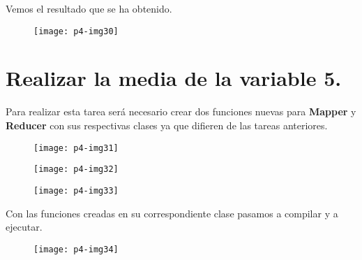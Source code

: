 \documentclass[10pt]{article}
\begin{document}
Vemos el resultado que se ha obtenido. \\

\begin{figure}[H]
	\begin{center}
 		\texttt{[image: p4-img30]}
	\end{center} 
\end{figure}


\section{Realizar la media de la variable 5.} 
Para realizar esta tarea será necesario crear dos funciones nuevas para \textbf{Mapper} y \textbf{Reducer} con sus respectivas clases ya que difieren de las tareas anteriores. \\

\begin{figure}[H]
	\begin{center}
 		\texttt{[image: p4-img31]}
	\end{center} 
\end{figure}

\begin{figure}[H]
	\begin{center}
 		\texttt{[image: p4-img32]}
	\end{center} 
\end{figure}

\begin{figure}[H]
	\begin{center}
 		\texttt{[image: p4-img33]}
	\end{center} 
\end{figure}

Con las funciones creadas en su correspondiente clase pasamos a compilar y a ejecutar. \\

\begin{figure}[H]
	\begin{center}
 		\texttt{[image: p4-img34]}
	\end{center} 
\end{figure}
\end{document}
